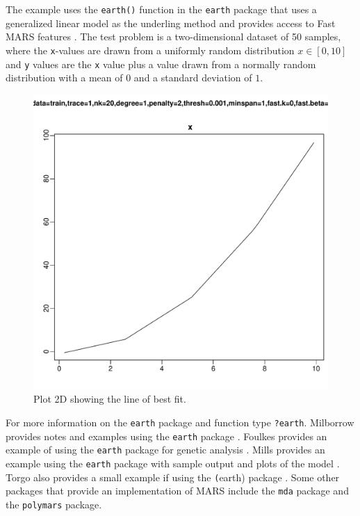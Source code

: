The example uses the \texttt{earth()} function in the \texttt{earth} package that uses a generalized linear model as the underling method and provides access to Fast MARS features \cite{Milborrow2012}.
The test problem is a two-dimensional dataset of 50 samples, where the \texttt{x}-values are drawn from a uniformly random distribution $x \in [0,10]$ and \texttt{y} values are the \texttt{x} value plus a value drawn from a normally random distribution with a mean of $0$ and a standard deviation of $1$.



\begin{figure}[htp]
\centering
\includegraphics[scale=0.45]{a_regression/multivariate_adaptive_regression_splines_result.pdf}
\caption{Plot 2D showing the line of best fit.}
\label{plot:multivariate_adaptive_regression_splines_result}
\end{figure}

For more information on the \texttt{earth} package and function type \texttt{?earth}. Milborrow provides notes and examples using the \texttt{earth} package \cite{Milborrow2011}. Foulkes provides an example of using the \texttt{earth} package for genetic analysis \cite{Foulkes2009}. Mills provides an example using the \texttt{earth} package with sample output and plots of the model \cite{Mills2010}. Torgo also provides a small example if using the \texttt(earth) package \cite{Torgo2009}. 
Some other packages that provide an implementation of MARS include the \texttt{mda} package and the \texttt{polymars} package.

